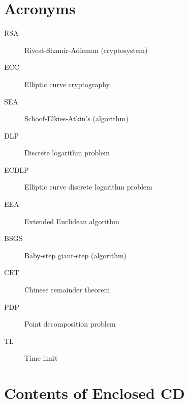 \documentclass[thesis=M,english]{FITthesis}[2012/10/20]
\theoremstyle{remark}
\theoremstyle{definition}
\begin{document}
\appendix

\chapter{Acronyms}
\begin{description}
	\item[RSA] Rivest-Shamir-Adleman (cryptosystem)
	\item[ECC] Elliptic curve cryptography
	\item[SEA] Schoof-Elkies-Atkin’s (algorithm)
	\item[DLP] Discrete logarithm problem
	\item[ECDLP] Elliptic curve discrete logarithm problem
	\item[EEA] Extended Euclidean algorithm
	\item[BSGS] Baby-step giant-step (algorithm)
	\item[CRT] Chinese remainder theorem
	\item[PDP] Point decomposition problem
	\item[TL] Time limit
\end{description}


\chapter{Contents of Enclosed CD}

\begin{figure}
\end{figure}
\end{document}
